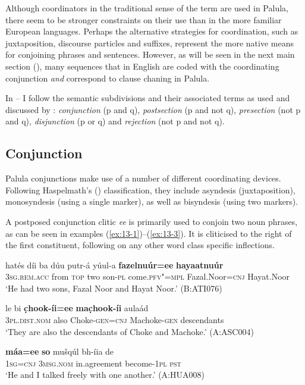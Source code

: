 Although coordinators in the traditional sense of the term are used in Palula, there seem to be stronger constraints on their use than in the more familiar European languages. Perhaps the alternative strategies for coordination, such as juxtaposition, discourse particles and suffixes, represent the more native means for conjoining phrases and sentences. However, as will be seen in the next main section (), many sequences that in English are coded with the coordinating conjunction \textit{and} correspond to clause chaning in Palula.



In -- I follow the semantic subdivisions and their associated terms as used and discussed by \citet{payne1985}: \textit{conjunction} (p and q), \textit{postsection} (p and not q), \textit{presection} (not p and q), \textit{disjunction} (p or q) and \textit{rejection} (not p and not q).


\subsection{Conjunction}
\label{subsec:13-2-1}

Palula conjunctions make use of a number of different coordinating devices. Following Haspelmath's (\citeyear{haspelmath2007}) classification, they include asyndesis (juxtaposition), monosyndesis (using a single marker), as well as bisyndesis (using two markers).

 A postposed conjunction clitic \textit{ee} is primarily used to conjoin two noun phrases, as can be seen in examples (\ref{ex:13-1})--(\ref{ex:13-3}). It is cliticised to the right of the first constituent, following on any other word class specific inflections.

\begin{exe}
\ex
\label{ex:13-1}
\gll hatés díi ba dúu putr-á yúul-a \textbf{fazelnuúr=ee} \textbf{hayaatnuúr} \\
\textsc{3sg.rem.acc} from \textsc{top} two son-\textsc{pl} come.\textsc{pfv"=mpl} Fazal.Noor=\textsc{cnj} Hayat.Noor\\
\glt `He had two sons, Fazal Noor and Hayat Noor.' (B:ATI076) 

\ex
\label{ex:13-2}
\gll le bi \textbf{c̣hook-íi=ee} \textbf{mac̣hook-íi} aulaád \\
\textsc{3pl.dist.nom} also Choke-\textsc{gen=cnj} Machoke-\textsc{gen} descendants\\
\glt `They are also the descendants of Choke and Machoke.' (A:ASC004)

\ex
\label{ex:13-3}
\gll \textbf{máa=ee} \textbf{so} mušqúl bh-íia de  \\
\textsc{1sg}=\textsc{cnj} \textsc{3msg.nom} in.agreement become-\textsc{1pl} \textsc{pst} \\
\glt `He and I talked freely with one another.' (A:HUA008) 
\end{exe}

